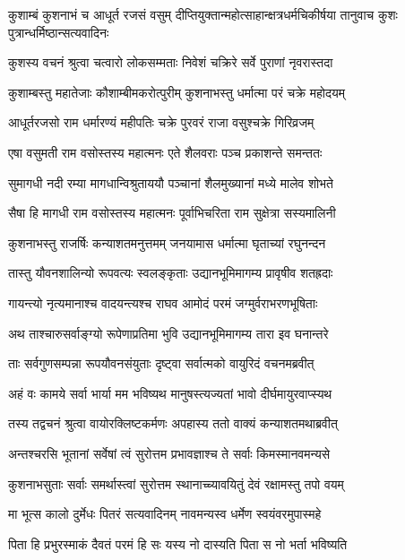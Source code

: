\threelineshloka
{कुशाम्बं कुशनाभं च आधूर्त रजसं वसुम्}
{दीप्तियुक्तान्महोत्साहान्क्षत्रधर्मचिकीर्षया}
{तानुवाच कुशः पुत्रान्धर्मिष्ठान्सत्यवादिनः} %

\twolineshloka
{कुशस्य वचनं श्रुत्वा चत्वारो लोकसम्मताः}
{निवेशं चक्रिरे सर्वे पुराणां नृवरास्तदा} %

\twolineshloka
{कुशाम्बस्तु महातेजाः कौशाम्बीमकरोत्पुरीम्}
{कुशनाभस्तु धर्मात्मा परं चक्रे महोदयम्} %

\twolineshloka
{आधूर्तरजसो राम धर्मारण्यं महीपतिः}
{चक्रे पुरवरं राजा वसुश्चक्रे गिरिव्रजम्} %

\twolineshloka
{एषा वसुमती राम वसोस्तस्य महात्मनः}
{एते शैलवराः पञ्च प्रकाशन्ते समन्ततः} %

\twolineshloka
{सुमागधी नदी रम्या मागधान्विश्रुताययौ}
{पञ्चानां शैलमुख्यानां मध्ये मालेव शोभते} %

\twolineshloka
{सैषा हि मागधी राम वसोस्तस्य महात्मनः}
{पूर्वाभिचरिता राम सुक्षेत्रा सस्यमालिनी} %

\twolineshloka
{कुशनाभस्तु राजर्षिः कन्याशतमनुत्तमम्}
{जनयामास धर्मात्मा घृताच्यां रघुनन्दन} %

\twolineshloka
{तास्तु यौवनशालिन्यो रूपवत्यः स्वलङ्कृताः}
{उद्यानभूमिमागम्य प्रावृषीव शतह्रदाः} %

\twolineshloka
{गायन्त्यो नृत्यमानाश्च वादयन्त्यश्च राघव}
{आमोदं परमं जग्मुर्वराभरणभूषिताः} %

\twolineshloka
{अथ ताश्चारुसर्वाङ्ग्यो रूपेणाप्रतिमा भुवि}
{उद्यानभूमिमागम्य तारा इव घनान्तरे} %

\twolineshloka
{ताः सर्वगुणसम्पन्ना रूपयौवनसंयुताः}
{दृष्ट्वा सर्वात्मको वायुरिदं वचनमब्रवीत्} %

\twolineshloka
{अहं वः कामये सर्वा भार्या मम भविष्यथ}
{मानुषस्त्यज्यतां भावो दीर्घमायुरवाप्स्यथ} %

\twolineshloka
{तस्य तद्वचनं श्रुत्वा वायोरक्लिष्टकर्मणः}
{अपहास्य ततो वाक्यं कन्याशतमथाब्रवीत्} %

\twolineshloka
{अन्तश्चरसि भूतानां सर्वेषां त्वं सुरोत्तम}
{प्रभावज्ञाश्च ते सर्वाः किमस्मानवमन्यसे} %

\twolineshloka
{कुशनाभसुताः सर्वाः समर्थास्त्वां सुरोत्तम}
{स्थानाच्च्यावयितुं देवं रक्षामस्तु तपो वयम्} %

\twolineshloka
{मा भूत्स कालो दुर्मेधः पितरं सत्यवादिनम्}
{नावमन्यस्व धर्मेण स्वयंवरमुपास्महे} %

\twolineshloka
{पिता हि प्रभुरस्माकं दैवतं परमं हि सः}
{यस्य नो दास्यति पिता स नो भर्ता भविष्यति} %

